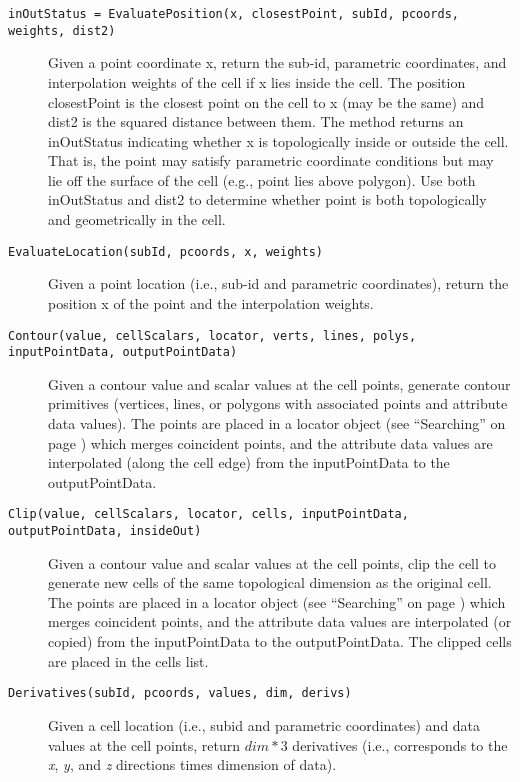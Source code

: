 \begin{description}
\begin{description}
    \item[\texttt{inOutStatus = EvaluatePosition(x, closestPoint, subId, pcoords, weights, dist2)}]
    Given a point coordinate x, return the sub-id, parametric coordinates, and interpolation weights of the cell if x lies inside the cell. The position closestPoint is the closest point on the cell to x (may be the same) and dist2 is the squared distance between them. The method returns an inOutStatus indicating whether x is topologically inside or outside the cell. That is, the point may satisfy parametric coordinate conditions but may lie off the surface of the cell (e.g., point lies above polygon). Use both inOutStatus and dist2 to determine whether point is both topologically and geometrically in the cell.

    \item[\texttt{EvaluateLocation(subId, pcoords, x, weights)}]
    Given a point location (i.e., sub-id and parametric coordinates), return the position x of the point and the interpolation weights.

    \item[\texttt{Contour(value, cellScalars, locator, verts, lines, polys, inputPointData, outputPointData)}]
    Given a contour value and scalar values at the cell points, generate contour primitives (vertices, lines, or polygons with associated points and attribute data values). The points are placed in a locator object (see ``Searching'' on page \pageref{subsec:searching}) which merges coincident points, and the attribute data values are interpolated (along the cell edge) from the inputPointData to the outputPointData.

    \item[\texttt{Clip(value, cellScalars, locator, cells, inputPointData, outputPointData, insideOut)}]
    Given a contour value and scalar values at the cell points, clip the cell to generate new cells of the same topological dimension as the original cell. The points are placed in a locator object (see ``Searching'' on page \pageref{subsec:searching}) which merges coincident points, and the attribute data values are interpolated (or copied) from the inputPointData to the outputPointData. The clipped cells are placed in the cells list.

    \item[\texttt{Derivatives(subId, pcoords, values, dim, derivs)}]
    Given a cell location (i.e., subid and parametric coordinates) and data values at the cell points, return $dim*3$ derivatives (i.e., corresponds to the \emph{x}, \emph{y}, and \emph{z} directions times dimension of data).


\end{description}
\end{description}
